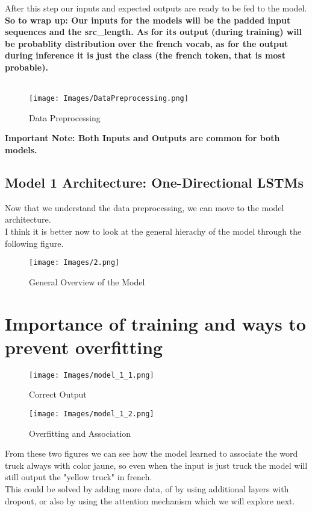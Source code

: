 \documentclass{article}
\begin{document}
After this step our inputs and expected outputs are ready to be fed to the model. \\ 
\textbf{So to wrap up: Our inputs for the models will be the padded input sequences and the src\_length. As for its output (during training) will be probablity distribution over the french vocab, as for the output during inference it is just the class (the french token, that is most probable).}\\ \\ 
\begin{figure}[H]
    \centering
    \texttt{[image: Images/DataPreprocessing.png]}
    \caption{Data Preprocessing}
\end{figure}
\textbf{Important Note: Both Inputs and Outputs are common for both models.}
\subsection{Model 1 Architecture: One-Directional LSTMs }
Now that we understand the data preprocessing, we can move to the model architecture.\\
I think it is better now to look at the general hierachy of the model through the following figure.\\
\begin{figure}[H]
    \centering
    \texttt{[image: Images/2.png]}
    \caption{General Overview of the Model}
\end{figure}
\section{Importance of training and ways to prevent overfitting}
\begin{figure}[H]
    \centering
    \texttt{[image: Images/model\_1\_1.png]}
    \caption{Correct Output}
\end{figure}
\begin{figure}[H]
    \centering
    \texttt{[image: Images/model\_1\_2.png]}
    \caption{Overfitting and Association}
\end{figure}
From these two figures we can see how the model learned to associate the word truck always with color jaune, so even when the input is just truck the model will still output the "yellow truck" in french. \\ This could be solved by adding more data, of by using additional layers with dropout, or also by using the attention mechanism which we will explore next. 
\end{document}
